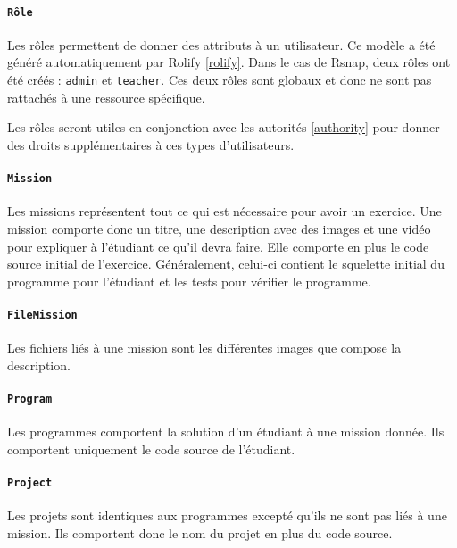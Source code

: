 \paragraph{\texttt{Rôle}} Les rôles permettent de donner des attributs à un utilisateur. Ce modèle a été généré automatiquement par Rolify \ref{rolify}. Dans le cas de Rsnap, deux rôles ont été créés : \texttt{admin} et \texttt{teacher}. Ces deux rôles sont globaux et donc ne sont pas rattachés à une ressource spécifique.%

Les rôles seront utiles en conjonction avec les autorités \ref{authority} pour donner des droits supplémentaires à ces types d'utilisateurs.

\paragraph{\texttt{Mission}} Les missions représentent tout ce qui est nécessaire pour avoir un exercice. Une mission comporte donc un titre, une description avec des images et une vidéo pour expliquer à l'étudiant ce qu'il devra faire. Elle comporte en plus le code source initial de l'exercice. Généralement, celui-ci contient le squelette initial du programme pour l'étudiant et les tests pour vérifier le programme. 

\paragraph{\texttt{FileMission}} Les fichiers liés à une mission sont les différentes images que compose la description. %

\paragraph{\texttt{Program}} Les programmes comportent la solution d'un étudiant à une mission donnée. Ils comportent uniquement le code source de l'étudiant.

\paragraph{\texttt{Project}} Les projets sont identiques aux programmes excepté qu'ils ne sont pas liés à une mission. Ils comportent donc le nom du projet en plus du code source.


